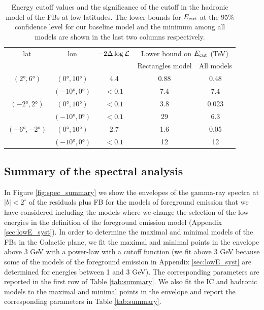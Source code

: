 \begin{table}
  \begin{center}
    \caption{\label{tab:pi0} 
Energy cutoff values and the significance of the cutoff in the hadronic model of the FBs at low latitudes.
The lower bounds for $E_{\text{cut}}$ at the 95\% confidence level for our baseline model and the minimum among all
models are shown in the last two columns respectively. 
}
    \begin{tabular}{|c|c|c|c|c|} %
     	\hline
		 lat & lon  & $-2 \Delta \log {\mathcal{L}}$ & \multicolumn{2}{c|}{Lower bound on $E_{\text{cut}}$ (TeV) } \\
		      &        &                                  &       \multicolumn{1}{c}{Rectangles model} & All models \\ 
		\hline
  		$(\ang{2}, \ang{6})$ & $(\ang{0}, \ang{10})$ & 4.4 & {0.88} & {0.48} \\ 
		& $(\ang{-10}, \ang{0})$ &  $ < 0.1$ & {7.4} & {7.4}\\ 
 		\hline
  		$(\ang{-2}, \ang{2})$ & $(\ang{0}, \ang{10})$ & $ < 0.1$ & {3.8} & 0.023 \\ 
		& $(\ang{-10}, \ang{0})$ & $ < 0.1$ & {29} & 6.3 \\ 
 		\hline
  		$(\ang{-6}, \ang{-2})$ & $(\ang{0}, \ang{10})$ & 2.7 & 1.6 & 0.05 \\ 
		& $(\ang{-10}, \ang{0})$ & $ < 0.1$ & {12} & {12}\\ 
 \hline
    \end{tabular}
  \end{center}
\end{table}

\subsection{Summary of the spectral analysis}

In Figure \ref{fig:spec_summary} we show the envelopes of the gamma-ray spectra at $|b| < 2^\circ$ of the residuals plus FB
for the models of foreground emission that we have considered including the models where we change the selection of the low energies 
in the definition of the foreground emission model (Appendix \ref{sec:lowE_syst}).
In order to determine the maximal and minimal models of the FBs in the Galactic plane, 
we fit the maximal and minimal points in the envelope above 3 GeV with a power-law with a cutoff function
(we fit above 3 GeV because some of the models of the foreground emission in Appendix \ref{sec:lowE_syst} are determined 
for energies between 1 and 3 GeV).
The corresponding parameters are reported in the first row of Table \ref{tab:summary}.
We also fit the IC and hadronic models to the maximal and minimal points in the envelope and report the corresponding parameters
in Table \ref{tab:summary}.


